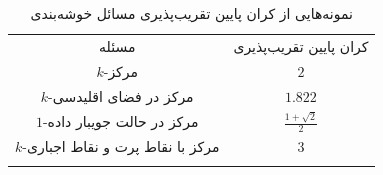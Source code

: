 \begin{table}[t]
\centering
\caption{نمونه‌هایی از کران پایین تقریب‌پذیری مسائل خوشه‌بندی}

\begin{tabular}{|c|c|}
\hfill
مسئله & کران پایین تقریب‌پذیری \\
\hfill
\hfill
$k$-مرکز & $2$ \cite{vazirani2013approximation} \\ 
$k$-مرکز در فضای اقلیدسی & $1.822$ \cite{bern1996approximation} \\
$1$-مرکز در حالت جویبار داده & $\frac{1 + \sqrt{2}}{2}$ \cite{agarwal2010streaming} \\
$k$-مرکز با نقاط پرت و نقاط اجباری & $3$ \cite{charikar2001algorithms}\\
\hfill
\end{tabular}

\end{table}
